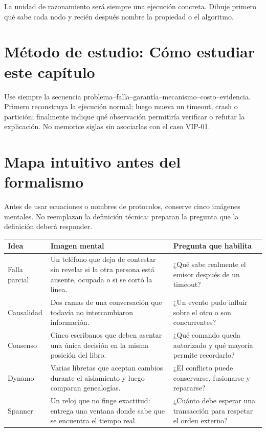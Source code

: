 \documentclass[variant=apuntes,cover=institutional,mode=screen]{ua-engineering-v6-article}
\begin{document}
\begin{uakeybox}
La unidad de razonamiento será siempre una ejecución concreta. Dibuje primero qué sabe cada nodo y recién después nombre la propiedad o el algoritmo.
\end{uakeybox}

\section{Método de estudio: Cómo estudiar este capítulo}
Use siempre la secuencia problema--falla--garantía--mecanismo--costo--evidencia. Primero reconstruya la ejecución normal; luego mueva un timeout, crash o partición; finalmente indique qué observación permitiría verificar o refutar la explicación. No memorice siglas sin asociarlas con el caso VIP-01.


\section{Mapa intuitivo antes del formalismo}

Antes de usar ecuaciones o nombres de protocolos, conserve cinco imágenes mentales. No reemplazan la definición técnica: preparan la pregunta que la definición deberá responder.

\begin{longtable}{p{}p{}p{}}
\toprule
\textbf{Idea} & \textbf{Imagen mental} & \textbf{Pregunta que habilita}\\
\midrule
Falla parcial & Un teléfono que deja de contestar sin revelar si la otra persona está ausente, ocupada o si se cortó la línea. & ¿Qué sabe realmente el emisor después de un timeout?\\
Causalidad & Dos ramas de una conversación que todavía no intercambiaron información. & ¿Un evento pudo influir sobre el otro o son concurrentes?\\
Consenso & Cinco escribanos que deben asentar una única decisión en la misma posición del libro. & ¿Qué comando queda autorizado y qué mayoría permite recordarlo?\\
Dynamo & Varias libretas que aceptan cambios durante el aislamiento y luego comparan genealogías. & ¿El conflicto puede conservarse, fusionarse y repararse?\\
Spanner & Un reloj que no finge exactitud: entrega una ventana donde sabe que se encuentra el tiempo real. & ¿Cuánto debe esperar una transacción para respetar el orden externo?\\
\bottomrule
\end{longtable}
\end{document}

